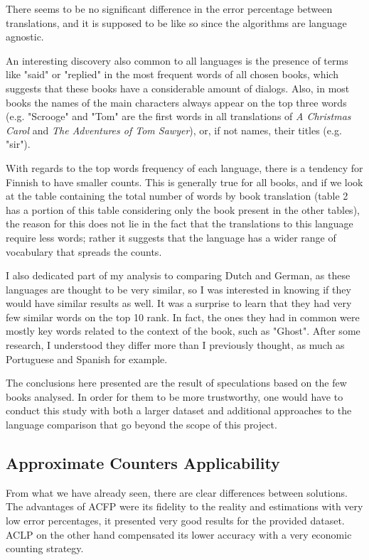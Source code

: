 \documentclass[shortpaper]{revdetua}
\begin{document}
There seems to be no significant difference in the error percentage between 
translations, and it is supposed to be like so since the algorithms are language 
agnostic.

An interesting discovery also common to all languages is the presence of terms 
like "said" or "replied" in the most frequent words of all chosen books, which 
suggests that these books have a considerable amount of dialogs. 
Also, in most books the names of the main characters always appear on the top 
three words (e.g. "Scrooge" and "Tom" are the first words in all translations of 
\textit{A Christmas Carol} and \textit{The Adventures of Tom Sawyer}), or, if not 
names, their titles (e.g. "sir").

With regards to the top words frequency of each language, there is a tendency 
for Finnish to have smaller counts.
This is generally true for all books, and if we look at the table containing the 
total number of words by book translation (table 2 has a portion of this table 
considering only the book present in the other tables), the reason for this does 
not lie in the fact that the translations to this language require less words; 
rather it suggests that the language has a wider range of vocabulary that spreads 
the counts.

I also dedicated part of my analysis to comparing Dutch and German, as these 
languages are thought to be very similar, so I was interested in knowing if they 
would have similar results as well.
It was a surprise to learn that they had very few similar words on the top 10 rank.
In fact, the ones they had in common were mostly key words related to the context 
of the book, such as "Ghost".
After some research, I understood they differ more than I previously thought, 
as much as Portuguese and Spanish for example.
\newline

The conclusions here presented are the result of speculations based on the few 
books analysed.
In order for them to be more trustworthy, one would have to conduct this study 
with both a larger dataset and additional approaches to the language comparison 
that go beyond the scope of this project.
\newpage

\subsection{Approximate Counters Applicability}

From what we have already seen, there are clear differences between solutions.
The advantages of ACFP were its fidelity to the reality and estimations with very
low error percentages, it presented very good results for the provided dataset.
ACLP on the other hand compensated its lower accuracy with a very economic counting 
strategy.
\end{document}
